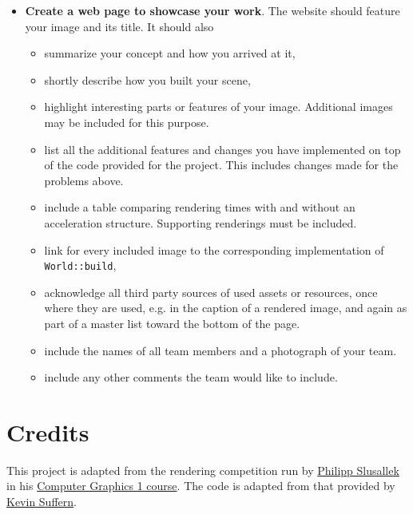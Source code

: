 \documentclass[addpoints]{exam}
\begin{document}
\begin{questions}
\begin{itemize}
\item \textbf{Create a web page to showcase your work}. The website should feature your image and its title. It should also
\begin{itemize}
\item summarize your concept and how you arrived at it,
\item shortly describe how you built your scene,
\item highlight interesting parts or features of your image. Additional images may be included for this purpose.
\item list all the additional features and changes you have implemented on top of the code provided for the project. This includes changes made for the problems above.
\item include a table comparing rendering times with and without an acceleration structure. Supporting renderings must be included.
\item link for every included image to the corresponding implementation of {\tt World::build},
\item acknowledge all third party sources of used assets or resources, once where they are used, e.g. in the caption of a rendered image,  and again as part of a master list toward the bottom of the page.
\item include the names of all team members and a photograph of your team.
\item include any other comments the team would like to include.
\end{itemize}
  \end{itemize}

\end{questions}

\section*{Credits}

This project is adapted from the rendering competition run by \href{https://graphics.cg.uni-saarland.de/people/slusallek.html}{Philipp Slusallek} in his \href{https://graphics.cg.uni-saarland.de/courses/cg1-2018/}{Computer Graphics 1 course}. The code is adapted from that provided by \href{http://www.raytracegroundup.com/}{Kevin Suffern}.
\end{document}
